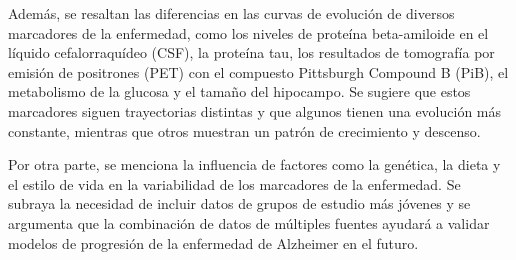 \documentclass[12pt]{article}
\begin{document}
Además, se resaltan las diferencias en las curvas de evolución de diversos marcadores de la enfermedad, como los niveles de proteína beta-amiloide en el líquido cefalorraquídeo (CSF), la proteína tau, los resultados de tomografía por emisión de positrones (PET) con el compuesto Pittsburgh Compound B (PiB), el metabolismo de la glucosa y el tamaño del hipocampo. Se sugiere que estos marcadores siguen trayectorias distintas y que algunos tienen una evolución más constante, mientras que otros muestran un patrón de crecimiento y descenso.

Por otra parte, se menciona la influencia de factores como la genética, la dieta y el estilo de vida en la variabilidad de los marcadores de la enfermedad. Se subraya la necesidad de incluir datos de grupos de estudio más jóvenes y se argumenta que la combinación de datos de múltiples fuentes ayudará a validar modelos de progresión de la enfermedad de Alzheimer en el futuro.
\end{document}
